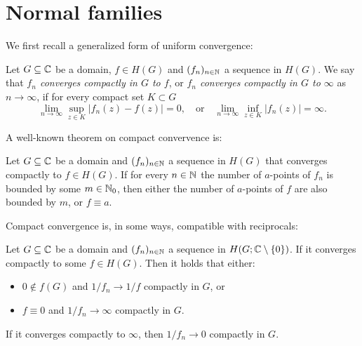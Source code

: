 \section{Normal families}
\label{sec:normal-families}

We first recall a generalized form of uniform convergence:

\begin{definition}
    Let $G \subseteq \mathbb{C}$ be a domain, $f \in H(G)$ and $(f_n)_{n \in \mathbb{N}}$ a sequence in $H(G)$. We say that \emph{$f_n$ converges compactly in $G$ to $f$}, or \emph{$f_n$ converges compactly in $G$ to $\infty$} as $n \to \infty$, if for every compact set $K \subset G$
    $$ \lim_{n \to \infty} \sup_{z \in K} \vert f_n(z) - f(z) \vert = 0, \quad \textrm{or} \quad \lim_{n \to \infty} \inf_{z \in K} \vert f_n(z) \vert = \infty. $$
\end{definition}


A well-known theorem on compact convervence is:

\begin{theorem}[Hurwitz] \label{thm:hurwitz}
    Let $G \subseteq \mathbb{C}$ be a domain and $(f_n)_{n \in \mathbb{N}}$ a sequence in $H(G)$ that converges compactly to $f \in H(G)$. If for every $n \in \mathbb{N}$ the number of $a$-points of $f_n$ is bounded by some $m \in \mathbb{N}_0$, then either the number of $a$-points of $f$ are also bounded by $m$, or $f \equiv a$.
\end{theorem}

Compact convergence is, in some ways, compatible with reciprocals:

\begin{lemma} \label{lem:compact-convergence-reciprocals}
Let $G \subseteq \mathbb{C}$ be a domain and $(f_n)_{n \in \mathbb{N}}$ a sequence in $H(G; \mathbb{C} \setminus \{ 0 \})$. If it converges compactly to some $f \in H(G)$. Then it holds that either:
\begin{itemize}
    \item $0 \notin f(G)$ and $1 / f_n \to 1 / f$ compactly in $G$, or
    \item $f \equiv 0$ and $1 / f_n \to \infty$ compactly in $G$.
\end{itemize}
If it converges compactly to $\infty$, then $1 / f_n \to 0$ compactly in $G$.
\end{lemma}

